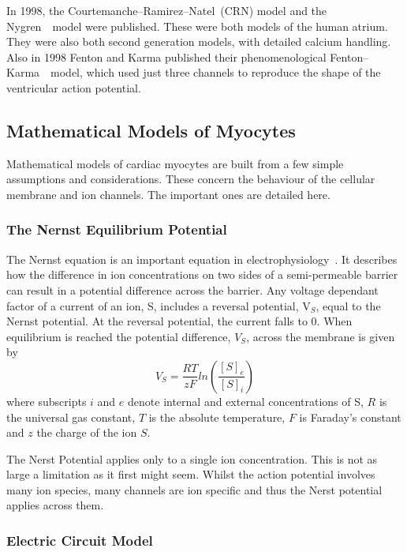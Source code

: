 In 1998, the Courtemanche--Ramirez--Natel\cite{CRN98}\ (CRN) model and the
Nygren~\cite{Nygren1998}\ model were published.
These were both models of the human atrium.
They were also both second generation models, with detailed calcium handling.
Also in 1998 Fenton and Karma published their phenomenological
Fenton--Karma~\cite{Fenton1998}\ model, which used just three channels to
reproduce the shape of the ventricular action potential.

\subsection{Mathematical Models of Myocytes}

Mathematical models of cardiac myocytes are built from a few simple assumptions
and considerations.
These concern the behaviour of the cellular membrane and ion channels.
The important ones are detailed here.

\subsubsection{The Nernst Equilibrium Potential}

The Nernst equation is an important equation in electrophysiology~\cite{Fall2002}.
It describes how the difference in ion concentrations on two sides of a
semi-permeable barrier can result in a potential difference across the barrier.
Any voltage dependant factor of a current of an ion, S, includes a reversal
potential, V$_{S}$, equal to the Nernst potential.
At the reversal potential, the current falls to 0.
When equilibrium is reached the potential difference, $V_{S}$, across the
membrane is given by
\begin{equation}
V_{S} = \frac{RT}{zF}ln\left( \frac{[S]_{e}}{[S]_{i}} \right) 
\end{equation} 
where subscripts $i$ and $e$ denote internal and external concentrations of S,
$R$ is the universal gas constant, $T$ is the absolute temperature, $F$ is
Faraday's constant and $z$ the charge of the ion $S$.

The Nerst Potential applies only to a single ion concentration.
This is not as large a limitation as it first might seem.
Whilst the action potential involves many ion species, many channels are ion
specific and thus the Nerst potential applies across them.

\subsubsection{Electric Circuit Model}

